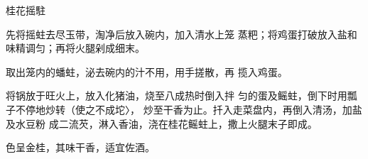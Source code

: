 \begin{recipe}{桂花摇駐}

\ingredients


\cooking

\step 先将摇蛀去尽玉带，淘净后放入碗内，加入清水上笼 蒸粑；将鸡蛋打破放入盐和味精调匀；再将火腿剁成细末。

取出笼内的蟠蛀，泌去碗内的汁不用，用手搓散，再 揽入鸡蛋。

\step 将锅放于旺火上，放入化猪油，烧至八成热时倒入拌 匀的蛋及鳐蛀，倒下时用瓢子不停地炒转（使之不成坨〉， 炒至干香为止。扦入走菜盘内，再倒入清汤，加盐及水豆粉 成二流芡，淋入香油，浇在桂花鳐蛀上，撒上火腿末子即成。

\notes

色呈金桂，其味干香，适宜佐酒。

\end{recipe}

